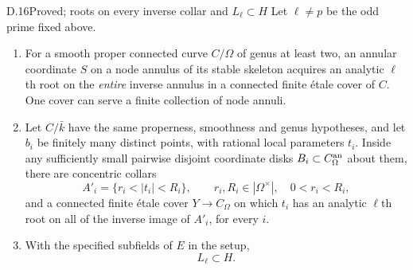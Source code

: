 \begin{claim}{D.16}{Proved; roots on every inverse collar and $L_\ell\subset H$}
\label{clm:D16}
Let $\ell\ne p$ be the odd prime fixed above.
\begin{enumerate}[label=(\roman*)]
\item For a smooth proper connected curve $C/\Omega$ of genus at
least two, an annular coordinate $S$ on a node annulus of its stable
skeleton acquires an analytic $\ell$th root on the \emph{entire}
inverse annulus in a connected finite \'etale cover of $C$.
One cover can serve a finite collection of node annuli.
\item Let $C/\bar k$ have the same properness, smoothness and genus
hypotheses, and let $b_i$ be finitely many distinct points, with
rational local parameters $t_i$. Inside any sufficiently small
pairwise disjoint coordinate disks $B_i\subset C_\Omega^{\rm an}$
about them, there are concentric collars
\[
 A'_i=\{r_i<|t_i|<R_i\},\qquad
             r_i,R_i\in|\Omega^\times|,\quad 0<r_i<R_i,
\]
and a connected finite \'etale cover $Y\to C_\Omega$ on which
$t_i$ has an analytic $\ell$th root on all of the inverse image
of $A'_i$, for every $i$.
\item With the specified subfields of $E$ in the setup,
\[
                              L_\ell\subset H.
\]
\end{enumerate}
\end{claim}
